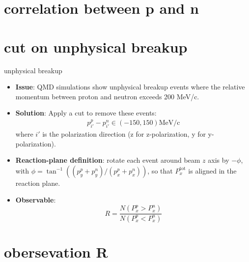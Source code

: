 \documentclass[aspectratio=169]{beamer}
\begin{document}
\section{correlation between p and n}



\section{cut on unphysical breakup}


\begin{frame}{unphysical breakup}
    \begin{itemize}
        \item \textbf{Issue}: QMD simulations show unphysical breakup events where the relative momentum between proton and neutron exceeds 200 MeV/c.
        \item \textbf{Solution}: Apply a cut to remove these events:
        \begin{align*}
            p^p_{i'} - p^n_{i'} \in (-150, 150) \mathrm{MeV/c}
        \end{align*}
        where \(i'\) is the polarization direction (z for z-polarization, y for y-polarization).
        \item \textbf{Reaction-plane definition}: rotate each event around beam \(z\) axis by \(-\phi\), with \(\phi=\tan^{-1}\!\left((p^p_y+p^n_y)/(p^p_x+p^n_x)\right)\), so that \(P_x^{\mathrm{tot}}\) is aligned in the reaction plane.
        \item \textbf{Observable}:
        \[
        R=\frac{N(P_x^p>P_x^n)}{N(P_x^p<P_x^n)}
        \]
    \end{itemize}
\end{frame}


\section{obersevation R }
\end{document}
